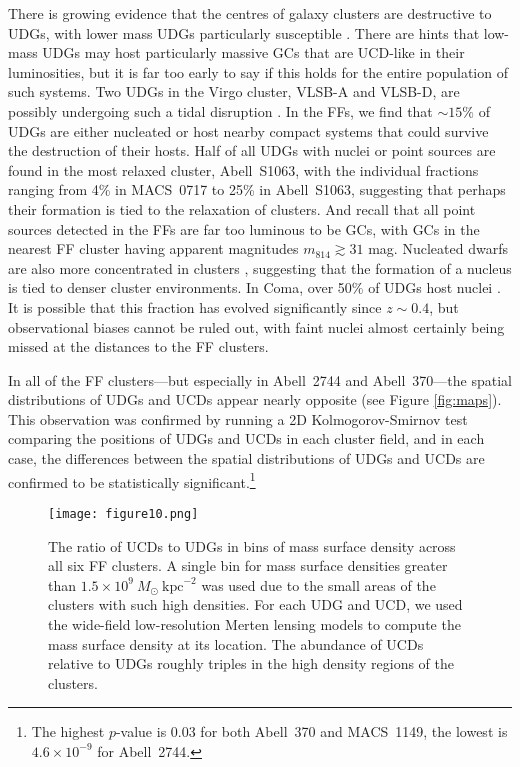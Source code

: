 \documentclass[iop,tighten,twocolumn,apj,floatfix]{emulateapj}
\begin{document}
There is growing evidence that the centres of galaxy clusters are destructive
to UDGs, with lower mass UDGs particularly susceptible \citep[e.g.][]{vdb2016, sales2019}.
There are hints that low-mass UDGs may host particularly massive GCs
\citep[e.g.\ NGC1052-DF2,][]{vandokkum2018b} that are UCD-like in their
luminosities, but it is far too early to say if this holds for the entire
population of such systems.
Two UDGs in the Virgo cluster, VLSB-A and VLSB-D, are possibly undergoing
such a tidal disruption \citep{mihos2017, toloba2018}.
In the FFs, we find that ${\sim}15\%$ of UDGs are either nucleated or host
nearby compact systems that could survive the destruction of their hosts.
Half of all UDGs with nuclei or point sources are found in the most relaxed
cluster, Abell~S1063, with the individual fractions ranging from 4\% in
MACS~0717 to 25\% in Abell~S1063, suggesting that perhaps their formation is
tied to the relaxation of clusters.
And recall that all point sources detected in the FFs are far too luminous to
be GCs, with GCs in the nearest FF cluster having apparent magnitudes $m_\mathrm{814}
\gtrsim 31$ mag.
Nucleated dwarfs are also more concentrated in clusters \citep{vcc6},
suggesting that the formation of a nucleus is tied to denser cluster
environments.
In Coma, over 50\% of UDGs host nuclei \citep{yagi2016}.
It is possible that this fraction has evolved significantly since $z \sim
0.4$, but observational biases cannot be ruled out, with faint nuclei almost
certainly being missed at the distances to the FF clusters.

In all of the FF clusters---but especially in Abell~2744 and Abell~370---the
spatial distributions of UDGs and UCDs appear nearly opposite (see Figure
\ref{fig:maps}).
This observation was confirmed by running a 2D Kolmogorov-Smirnov test
\citep{nrc} comparing the positions of UDGs and UCDs in each cluster field,
and in each case, the differences between the spatial distributions of UDGs
and UCDs are confirmed to be statistically significant.\footnote{The highest
$p$-value is 0.03 for both Abell~370 and MACS~1149, the lowest is $4.6 \times
10^{-9}$ for Abell~2744.}

\begin{figure}
	\texttt{[image: figure10.png]}
	\caption{
    The ratio of UCDs to UDGs in bins of mass surface density across all six
    FF clusters.
    A single bin for mass surface densities greater than $1.5 \times
    10^9~M_\odot~\mathrm{kpc}^{-2}$ was used due to the small areas of the
    clusters with such high densities.
    For each UDG and UCD, we used the wide-field low-resolution Merten lensing
    models \citep{merten2009,merten2011,zitrin2009,zitrin2013} to compute the
    mass surface density at its location.
    The abundance of UCDs relative to UDGs roughly triples in the high density
    regions of the clusters.
    \label{fig:ucdudg-ratio}
	}
\end{figure}
\end{document}

